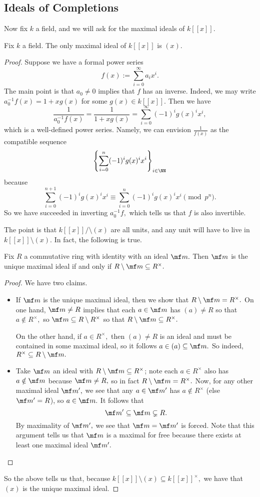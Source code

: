 \subsection{Ideals of Completions}
Now fix $k$ a field, and we will ask for the maximal ideals of $k[[x]].$
\begin{proposition}
	Fix $k$ a field. The only maximal ideal of $k[[x]]$ is $(x).$
\end{proposition}
\begin{proof}
	Suppose we have a formal power series
	\[f(x):=\sum_{i=0}^\infty a_ix^i.\]
	The main point is that $a_0\ne0$ implies that $f$ has an inverse. Indeed, we may write $a_0^{-1}f(x)=1+xg(x)$ for some $g(x)\in k[[x]].$ Then we have
	\[\frac1{a_0^{-1}f(x)}=\frac1{1+xg(x)}=\sum_{i=0}^\infty(-1)^ig(x)^ix^i,\]
	which is a well-defined power series. Namely, we can envision $\frac1{f(x)}$ as the compatible sequence
	\[\left\{\sum_{i=0}^n(-1)^ig(x)^ix^i\right\}_{i\in\NN}\]
	because
	\[\sum_{i=0}^{n+1}(-1)^ig(x)^ix^i\equiv\sum_{i=0}^n(-1)^ig(x)^ix^i\pmod{p^n}.\]
	So we have succeeded in inverting $a_0^{-1}f,$ which tells us that $f$ is also invertible.
	
	The point is that $k[[x]]/\setminus(x)$ are all units, and any unit will have to live in $k[[x]]\setminus(x).$ In fact, the following is true.
	\begin{lemma} \label{lem:uniqmax}
		Fix $R$ a commutative ring with identity with an ideal $\mf m.$ Then $\mf m$ is the unique maximal ideal if and only if $R\setminus\mf m\subseteq R^\times.$
	\end{lemma}
	\begin{proof}
		We have two claims.
		\begin{itemize}
			\item If $\mf m$ is the unique maximal ideal, then we show that $R\setminus\mf m=R^\times.$ On one hand, $\mf m\ne R$ implies that each $a\in\mf m$ has $(a)\ne R$ so that $a\notin R^\times,$ so $\mf m\subseteq R\setminus R^\times$ so that $R\setminus\mf m\subseteq R^\times.$
			
			On the other hand, if $a\in R^\times,$ then $(a)\ne R$ is an ideal and must be contained in some maximal ideal, so it follows $a\in(a)\subseteq\mf m.$ So indeed, $R^\times\subseteq R\setminus\mf m.$
			\item Take $\mf m$ an ideal with $R\setminus\mf m\subseteq R^\times$; note each $a\in R^\times$ also has $a\notin\mf m$ because $\mf m\ne R,$ so in fact $R\setminus\mf m=R^\times.$ Now, for any other maximal ideal $\mf m',$ we see that any $a\in\mf m'$ has $a\notin R^\times$ (else $\mf m'=R$), so $a\in\mf m.$ It follows that
			\[\mf m'\subseteq\mf m\subsetneq R.\]
			By maximality of $\mf m',$ we see that $\mf m=\mf m'$ is forced. Note that this argument tells us that $\mf m$ is a maximal for free because there exists at least one maximal ideal $\mf m'.$
			\qedhere
		\end{itemize}
	\end{proof}
	So the above tells us that, because $k[[x]]\setminus(x)\subseteq k[[x]]^\times,$ we have that $(x)$ is the unique maximal ideal.
\end{proof}
